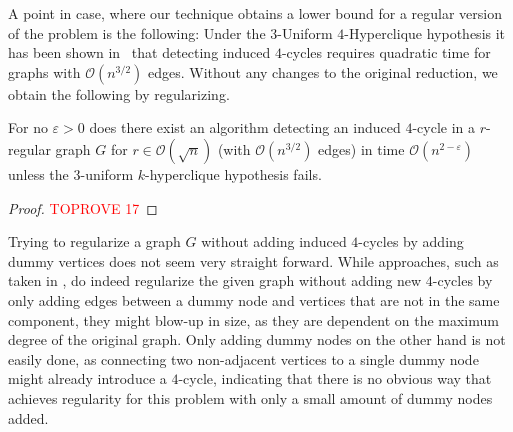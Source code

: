 \documentclass[a4paper,UKenglish,cleveref, autoref, thm-restate,numberwithinsect]{lipics-v2021}
\begin{document}
A point in case, where our technique obtains a lower bound for a regular version of the problem is the following:
Under the $3$-Uniform $4$-Hyperclique hypothesis it has been shown in~\cite{DalirrooyfardW22} that detecting induced $4$-cycles requires quadratic time for graphs with $\mathcal{O}(n^{3/2})$ edges.
Without any changes to the original reduction, we obtain the following by regularizing.
\begin{theorem}
    For no $\varepsilon > 0$ does there exist an algorithm detecting an induced $4$-cycle in a $r$-regular graph $G$ for $r \in \mathcal{O}(\sqrt n)$ (with $\mathcal{O}(n^{3/2})$ edges) in time $\mathcal{O}(n^{2 - \varepsilon})$ unless the $3$-uniform $k$-hyperclique hypothesis fails.
\end{theorem}
\begin{proof}\textcolor{red}{TOPROVE 17}\end{proof}
Trying to regularize a graph $G$ without adding induced $4$-cycles by adding dummy vertices does not seem very straight forward.
While approaches, such as taken in \cite{Cai08}, do indeed regularize the given graph without adding new $4$-cycles by only adding edges between a dummy node and vertices that are not in the same component,
they might blow-up in size, as they are dependent on the maximum degree of the original graph.
Only adding dummy nodes on the other hand is not easily done, as connecting two non-adjacent vertices to a single dummy node might already introduce a $4$-cycle,
indicating that there is no obvious way that achieves regularity for this problem with only a small amount of dummy nodes added.


\end{document}
